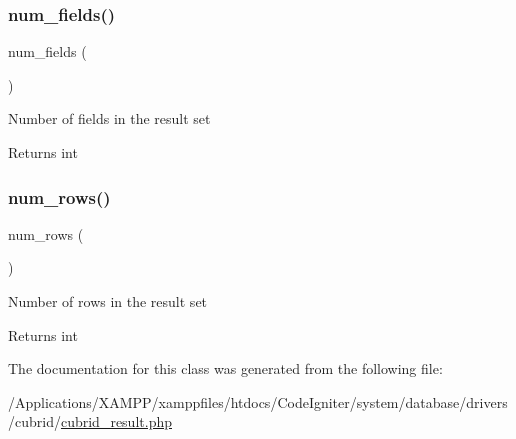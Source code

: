 \subsubsection{\texorpdfstring{num\+\_\+fields()}{num\_fields()}}
{\footnotesize\ttfamily num\+\_\+fields (\begin{DoxyParamCaption}{ }\end{DoxyParamCaption})}

Number of fields in the result set

\begin{DoxyReturn}{Returns}
int 
\end{DoxyReturn}
\mbox{\label{class_c_i___d_b__cubrid__result_a218657c303ee499b97710ab0cd2f5d6e}} 
\subsubsection{\texorpdfstring{num\+\_\+rows()}{num\_rows()}}
{\footnotesize\ttfamily num\+\_\+rows (\begin{DoxyParamCaption}{ }\end{DoxyParamCaption})}

Number of rows in the result set

\begin{DoxyReturn}{Returns}
int 
\end{DoxyReturn}


The documentation for this class was generated from the following file\+:\begin{DoxyCompactItemize}
\item 
/\+Applications/\+X\+A\+M\+P\+P/xamppfiles/htdocs/\+Code\+Igniter/system/database/drivers/cubrid/\mbox{\hyperlink{cubrid__result_8php}{cubrid\+\_\+result.\+php}}\end{DoxyCompactItemize}
